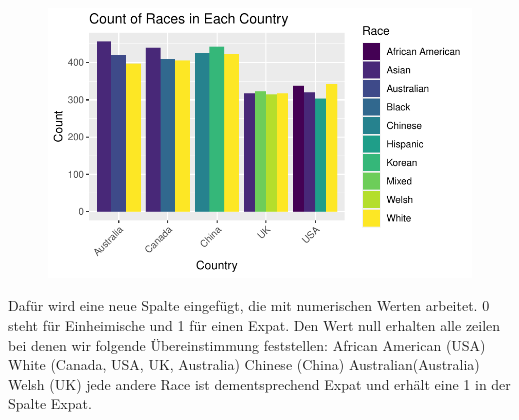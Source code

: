 \documentclass[
  letterpaper,
  DIV=11,
  numbers=noendperiod]{scrartcl}
\begin{document}
\begin{figure}[H]

{\centering \includegraphics{main_doc_files/figure-pdf/unnamed-chunk-64-1.pdf}

}

\end{figure}

Dafür wird eine neue Spalte eingefügt, die mit numerischen Werten
arbeitet. 0 steht für Einheimische und 1 für einen Expat. Den Wert null
erhalten alle zeilen bei denen wir folgende Übereinstimmung feststellen:
African American (USA) White (Canada, USA, UK, Australia) Chinese
(China) Australian(Australia) Welsh (UK) jede andere Race ist
dementsprechend Expat und erhält eine 1 in der Spalte Expat.
\end{document}
